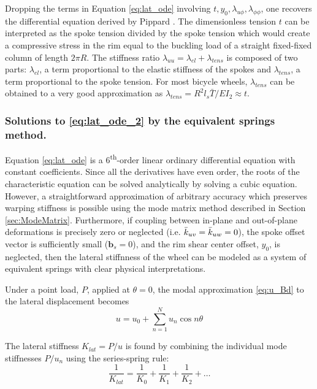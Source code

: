 \documentclass[\rootdir/thesis.tex]{subfiles}
\begin{document}
Dropping the terms in Equation \eqref{eq:lat_ode} involving $t, y_0, \lambda_{u\phi}, \lambda_{\phi\phi}$, one recovers the differential equation derived by Pippard \cite{Pippard1932a}. The dimensionless tension $t$ can be interpreted as the spoke tension divided by the spoke tension which would create a compressive stress in the rim equal to the buckling load of a straight fixed-fixed column of length $2\pi R$. The stiffness ratio $\lambda_{uu}=\lambda_{el}+\lambda_{tens}$ is composed of two parts: $\lambda_{el}$, a term proportional to the elastic stiffness of the spokes and $\lambda_{tens}$, a term proportional to the spoke tension. For most bicycle wheels, $\lambda_{tens}$ can be obtained to a very good approximation as $\lambda_{tens} = R^2l_s\bar{T}/EI_2 \approx t$.

\inprogress

\subsubsection{Solutions to \eqref{eq:lat_ode_2} by the equivalent springs method.}
\label{sec:equiv_springs}

Equation \eqref{eq:lat_ode} is a 6\textsuperscript{th}-order linear ordinary differential equation with constant coefficients. Since all the derivatives have even order, the roots of the characteristic equation can be solved analytically by solving a cubic equation. However, a straightforward approximation of arbitrary accuracy which preserves warping stiffness is possible using the mode matrix method described in Section \ref{sec:ModeMatrix}. Furthermore, if coupling between in-plane and out-of-plane deformations is precisely zero or neglected (i.e. $\bar{k}_{uv} = \bar{k}_{uw} = 0$), the spoke offset vector is sufficiently small ($\mathbf{b}_s=0$), and the rim shear center offset, $y_0$, is neglected, then the lateral stiffnness of the wheel can be modeled as a system of equivalent springs with clear physical interpretations.

Under a point load, $P$, applied at $\theta=0$, the modal approximation \eqref{eq:u_Bd} to the lateral displacement becomes
\begin{equation}
\label{eq:u_kequiv}
u = u_0 + \sum_{n=1}^N u_n \cos{n\theta}
\end{equation}

The lateral stiffness $K_{lat}=P/u$ is found by combining the individual mode stiffnesses $P/u_n$ using the series-spring rule:
\begin{equation}
\label{eq:Klat_series}
\frac{1}{K_{lat}} = \frac{1}{K_0} + \frac{1}{K_1} + \frac{1}{K_2} + \dots
\end{equation}
\end{document}
